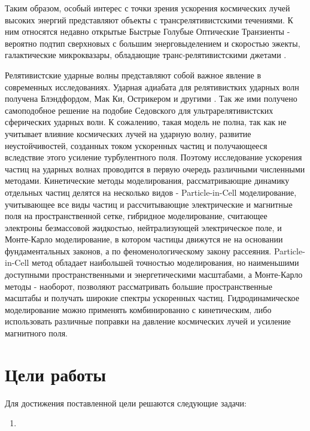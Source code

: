 Таким образом, особый интерес с точки зрения ускорения космических лучей высоких энергий представляют объекты с трансрелятивистскими течениями. К ним относятся недавно открытые Быстрые Голубые Оптические Транзиенты - вероятно подтип сверхновых с большим энерговыделением и скоростью эжекты, галактические микроквазары, обладающие транс-релятивистскими джетами .

Релятивистские ударные волны представляют собой важное явление в современных исследованиях. Ударная адиабата для релятивистких ударных волн получена Блэндфордом, Мак Ки, Острикером и другими \cite{Blandford1976, McKeeOstriker}. Так же ими получено самоподобное решение на подобие Седовского для ультрарелятивистских сферических ударных волн. К сожалению, такая модель не полна, так как не учитывает влияние космических лучей на ударную волну, развитие неустойчивостей, созданных током ускоренных частиц и получающееся вследствие этого усиление турбулентного поля. Поэтому исследование ускорения частиц на ударных волнах проводится в первую очередь различными численными методами. Кинетические методы моделирования, рассматривающие динамику отдельных частиц делятся на несколько видов - Particle-in-Cell моделирование, учитывающее все виды частиц и рассчитывающие электрические и магнитные поля на пространственной сетке, гибридное моделирование, считающее электроны безмассовой жидкостью, нейтрализующей электрическое поле, и Монте-Карло моделирование, в котором частицы движутся не на основании фундаментальных законов, а по феноменологическому закону рассеяния. Particle-in-Cell метод обладает наибольшей точностью моделирования, но наименьшими доступными пространственными и энергетическими масштабами, а Монте-Карло методы - наоборот, позволяют рассматривать большие пространственные масштабы и получать широкие спектры ускоренных частиц. Гидродинамическое моделирование можно применять комбинированно с кинетическим, либо использовать различные поправки на давление космических лучей и усиление магнитного поля.


\section*{Цели работы}

Для достижения поставленной цели решаются следующие задачи:
\begin{enumerate}
\item 
\end{enumerate}

